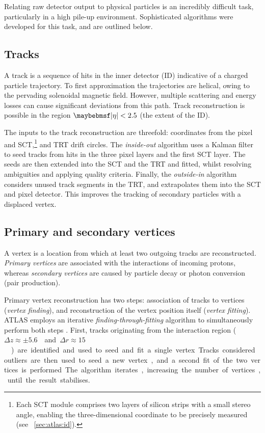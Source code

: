 
Relating raw detector output to physical particles is an incredibly difficult task,
particularly in a high pile-up environment. Sophisticated algorithms were developed for 
this task, and are outlined below.



\subsection{Tracks}
\label{sec:objects:tracks}

A track is a sequence of hits in the inner detector (ID) indicative of a charged particle 
trajectory. To first approximation the trajectories are helical, owing to the pervading 
solenoidal magnetic field. However, multiple scattering and energy losses can cause 
significant deviations from this path. Track 
reconstruction is possible in the region $\mods{\eta} < 2.5$ (the extent of the ID).

The inputs to the track reconstruction are threefold: coordinates from the pixel and 
SCT,\footnote{
	Each SCT module comprises two layers of silicon strips with a small stereo angle, 
	enabling the three-dimensional coordinate to be precisely 
	measured (see \Section~\ref{sec:atlas:id}).
}
and TRT drift circles. The \textit{inside-out} algorithm 
\cite{Tracking,ATLAS:ExpectPerf} uses a Kalman filter to seed tracks from hits in the 
three pixel layers and the first SCT layer. The seeds are then extended 
into the SCT and the TRT and fitted, whilst resolving ambiguities and applying 
quality criteria. Finally, the \textit{outside-in} algorithm \cite{Tracking} considers 
unused track segments in the TRT, and extrapolates them into the SCT and 
pixel detector. This improves the tracking of secondary particles with a displaced vertex.



\subsection{Primary and secondary vertices}
\label{sec:objects:vertices}

A vertex is a location from which at least two outgoing tracks are reconstructed. 
\textit{Primary vertices} are associated with the interactions of incoming protons, 
whereas \textit{secondary vertices} are caused by particle decay or photon conversion
(\epluseminus pair production).

Primary vertex reconstruction has two steps: association of tracks to vertices 
(\textit{vertex finding}), and reconstruction of the vertex position itself 
(\textit{vertex fitting}). ATLAS employs an iterative \textit{finding-through-fitting} 
algorithm to simultaneously perform both steps \cite{PrimVertexFinding,AllVertexFinding}.
First, tracks originating from the interaction region 
(\unit{$\Delta z \approx \pm5.6$}{\centi\metre} and 
\unit{$\Delta r \approx 15$}{\micro\metre}) are identified and used to seed and fit a 
single vertex. Tracks considered outliers are then used to seed a new vertex, and a 
second fit of the two vertices is performed. The algorithm iterates, increasing the 
number of vertices, until the result stabilises.

